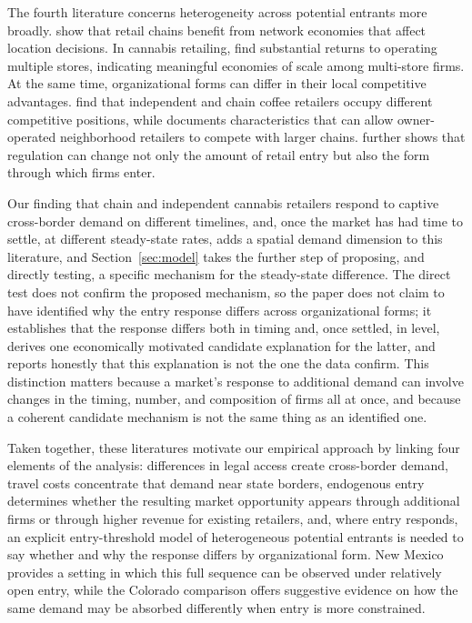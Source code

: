 \documentclass[english,12pt]{article}
\begin{document}
The fourth literature concerns heterogeneity across potential entrants more broadly. \citet{EllicksonHoughtonTimmins2013} show that retail chains benefit from network economies that affect location decisions. In cannabis retailing, \citet{HollenbeckGiroldo2022} find substantial returns to operating multiple stores, indicating meaningful economies of scale among multi-store firms. At the same time, organizational forms can differ in their local competitive advantages. \citet{AdamsEtAl2018} find that independent and chain coffee retailers occupy different competitive positions, while \citet{TalamasMarcos2025} documents characteristics that can allow owner-operated neighborhood retailers to compete with larger chains. \citet{Sadun2015} further shows that regulation can change not only the amount of retail entry but also the form through which firms enter.

Our finding that chain and independent cannabis retailers respond to captive cross-border demand on different timelines, and, once the market has had time to settle, at different steady-state rates, adds a spatial demand dimension to this literature, and Section~\ref{sec:model} takes the further step of proposing, and directly testing, a specific mechanism for the steady-state difference. The direct test does not confirm the proposed mechanism, so the paper does not claim to have identified why the entry response differs across organizational forms; it establishes that the response differs both in timing and, once settled, in level, derives one economically motivated candidate explanation for the latter, and reports honestly that this explanation is not the one the data confirm. This distinction matters because a market's response to additional demand can involve changes in the timing, number, and composition of firms all at once, and because a coherent candidate mechanism is not the same thing as an identified one.

Taken together, these literatures motivate our empirical approach by linking four elements of the analysis: differences in legal access create cross-border demand, travel costs concentrate that demand near state borders, endogenous entry determines whether the resulting market opportunity appears through additional firms or through higher revenue for existing retailers, and, where entry responds, an explicit entry-threshold model of heterogeneous potential entrants is needed to say whether and why the response differs by organizational form. New Mexico provides a setting in which this full sequence can be observed under relatively open entry, while the Colorado comparison offers suggestive evidence on how the same demand may be absorbed differently when entry is more constrained.
\end{document}
